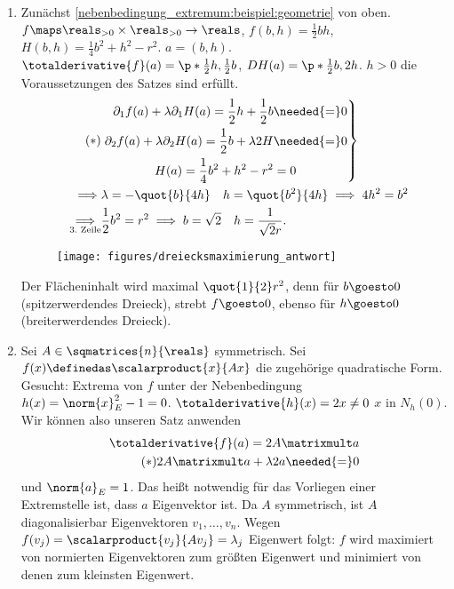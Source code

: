 \begin{beispiele*}
  \begin{enumerate}
    \item Zunächst \ref{nebenbedingung_extremum:beispiel:geometrie} von oben. \( f\maps \reals_{>0}\times \reals_{>0}\to \reals \), \( f(b,h)=\frac{1}{2}bh \), \( H(b,h)=\frac{1}{4}b^2+h^2-r^2 \). \( a=(b,h) \). \( \totalderivative{f}(a)=\p*{ \frac{1}{2}h,\frac{1}{2}b } \), \( DH(a)=\p*{ \frac{1}{2}b, 2h } \). \( h>0 \) \timplies die Voraussetzungen des Satzes sind erfüllt.
    \begin{align*}
      \tag{\(*\)}&\left.\begin{aligned}
        \partial_1 f(a)+\lambda \partial_1 H(a)=\frac{1}{2}h+\frac{1}{2}b&\needed{=}0\\
        \partial_2 f(a)+\lambda\partial_2 H(a)=\frac{1}{2}b+\lambda 2H&\needed{=}0\\
        H(a)=\frac{1}{4}b^2+h^2-r^2&=0
      \end{aligned}\right\}\\
      \implies &\lambda=-\quot{b}{4h}\quad h=\quot{b^2}{4h} \implies 4h^2=b^2\\
      \underset{\text{3.\ Zeile}}{\implies} &\frac{1}{2}b^2=r^2\implies b=\sqrt{2}\quad h=\frac{1}{\sqrt{2}r}.
    \end{align*}
    \begin{figure}[H]
      \centering
      \texttt{[image: figures/dreiecksmaximierung\_antwort]}
      \label{fig:dreiecksmaximierung_antwort}
    \end{figure}
    Der Flächeninhalt wird maximal \( \quot{1}{2}r^2 \), denn für \( b\goesto 0 \) (spitzerwerdendes Dreieck), strebt \( f\goesto 0 \), ebenso für \( h\goesto 0 \) (breiterwerdendes Dreieck).
    \item Sei \( A\in \sqmatrices{n}{\reals} \) symmetrisch. Sei \( f(x)\definedas \scalarproduct{x}{Ax} \) die zugehörige quadratische Form. Gesucht: Extrema von \( f \) unter der Nebenbedingung \( h(x)=\norm{x}_E^2-1=0 \). \( \totalderivative{h}(x)=2x\neq 0 \) \tforall \( x \) in \( N_h(0) \). Wir können also unseren Satz anwenden
    \begin{align*}
      \totalderivative{f}(a)=2A\matrixmult a\\
      \tag{\(*\)} 2A\matrixmult a+\lambda 2a\needed{=}0
    \end{align*}
    und \( \norm{a}_E=1 \). Das heißt notwendig für das Vorliegen einer Extremstelle ist, dass \( a \) Eigenvektor ist. Da \( A \) symmetrisch, ist \( A \) diagonalisierbar \timplies \texists  Eigenvektoren \( v_1,\dotsc, v_n \). Wegen \( f(v_j)=\scalarproduct{v_j}{A v_j}=\lambda_j \) Eigenwert folgt: \( f \) wird maximiert von normierten Eigenvektoren zum größten Eigenwert und minimiert von denen zum kleinsten Eigenwert.

\end{enumerate}
\end{beispiele*}
